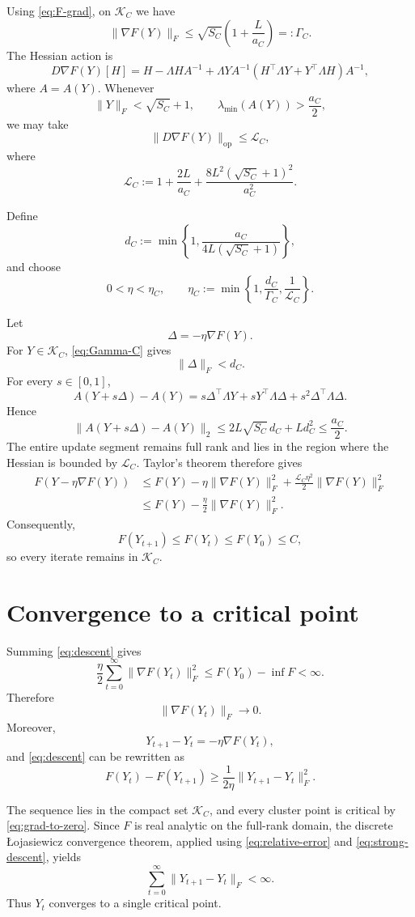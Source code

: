 \documentclass[11pt]{article}
\newcommand{\cK}{\mathcal{K}}
\begin{document}
Using \eqref{eq:F-grad}, on \(\cK_C\) we have
\[
\|\nabla F(Y)\|_F
\le
\sqrt{S_C}
\left(
1+\frac{L}{a_C}
\right)
=:
\Gamma_C.
\tag{8}
\label{eq:Gamma-C}
\]
The Hessian action is
\[
D\nabla F(Y)[H]
=
H-\Lambda H A^{-1}
+
\Lambda Y A^{-1}
\left(
H^\top\Lambda Y+Y^\top\Lambda H
\right)
A^{-1},
\tag{9}
\label{eq:F-Hessian}
\]
where \(A=A(Y)\). Whenever
\[
\|Y\|_F<\sqrt{S_C}+1,
\qquad
\lambda_{\min}(A(Y))>\frac{a_C}{2},
\]
we may take
\[
\|D\nabla F(Y)\|_{\mathrm{op}}
\le
\mathcal L_C,
\]
where
\[
\mathcal L_C
:=
1
+
\frac{2L}{a_C}
+
\frac{8L^2(\sqrt{S_C}+1)^2}{a_C^2}.
\tag{10}
\label{eq:L-C}
\]

Define
\[
d_C
:=
\min\left\{
1,
\frac{a_C}{4L(\sqrt{S_C}+1)}
\right\},
\tag{11}
\label{eq:d-C}
\]
and choose
\[
0<\eta<\eta_C,
\qquad
\eta_C
:=
\min\left\{
1,
\frac{d_C}{\Gamma_C},
\frac{1}{\mathcal L_C}
\right\}.
\tag{12}
\label{eq:eta-C}
\]

Let
\[
\Delta=-\eta\nabla F(Y).
\]
For \(Y\in\cK_C\), \eqref{eq:Gamma-C} gives
\[
\|\Delta\|_F<d_C.
\]
For every \(s\in[0,1]\),
\[
A(Y+s\Delta)-A(Y)
=
s\Delta^\top\Lambda Y
+
sY^\top\Lambda\Delta
+
s^2\Delta^\top\Lambda\Delta.
\]
Hence
\[
\|A(Y+s\Delta)-A(Y)\|_2
\le
2L\sqrt{S_C}\,d_C+Ld_C^2
\le
\frac{a_C}{2}.
\]
The entire update segment remains full rank and lies in the region where the
Hessian is bounded by \(\mathcal L_C\). Taylor's theorem therefore gives
\[
\begin{aligned}
F(Y-\eta\nabla F(Y))
&\le
F(Y)
-
\eta\|\nabla F(Y)\|_F^2
+
\frac{\mathcal L_C\eta^2}{2}\|\nabla F(Y)\|_F^2\\
&\le
F(Y)
-
\frac{\eta}{2}\|\nabla F(Y)\|_F^2.
\end{aligned}
\tag{13}
\label{eq:descent}
\]
Consequently,
\[
F(Y_{t+1})\le F(Y_t)\le F(Y_0)\le C,
\]
so every iterate remains in \(\cK_C\).

\section{Convergence to a critical point}

Summing \eqref{eq:descent} gives
\[
\frac{\eta}{2}
\sum_{t=0}^\infty
\|\nabla F(Y_t)\|_F^2
\le
F(Y_0)-\inf F
<\infty.
\]
Therefore
\[
\|\nabla F(Y_t)\|_F\longrightarrow0.
\tag{14}
\label{eq:grad-to-zero}
\]
Moreover,
\[
Y_{t+1}-Y_t
=
-\eta\nabla F(Y_t),
\tag{15}
\label{eq:relative-error}
\]
and \eqref{eq:descent} can be rewritten as
\[
F(Y_t)-F(Y_{t+1})
\ge
\frac{1}{2\eta}\|Y_{t+1}-Y_t\|_F^2.
\tag{16}
\label{eq:strong-descent}
\]

The sequence lies in the compact set \(\cK_C\), and every cluster point is
critical by \eqref{eq:grad-to-zero}. Since \(F\) is real analytic on the
full-rank domain, the discrete \L{}ojasiewicz convergence theorem, applied
using \eqref{eq:relative-error} and \eqref{eq:strong-descent}, yields
\[
\sum_{t=0}^\infty
\|Y_{t+1}-Y_t\|_F
<
\infty.
\]
Thus \(Y_t\) converges to a single critical point.
\end{document}
